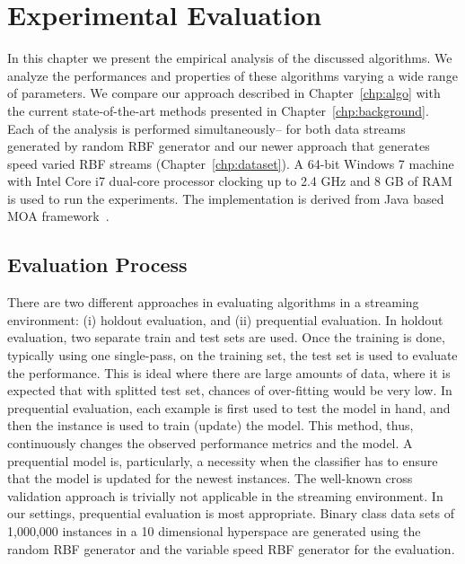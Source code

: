 \chapter{Experimental Evaluation}
\label{chp:exp}
In this chapter we present the empirical analysis of the discussed algorithms. We analyze the performances and properties of these algorithms varying a wide range of parameters. We compare our approach described in Chapter~\ref{chp:algo} with the current state-of-the-art methods presented in Chapter~\ref{chp:background}. Each of the analysis is performed simultaneously-- for both data streams generated by random RBF generator and our newer approach that generates speed varied RBF streams (Chapter~\ref{chp:dataset}). A 64-bit Windows 7 machine with Intel Core i7 dual-core processor clocking up to 2.4 GHz and 8 GB of RAM is used to run the experiments. The implementation is derived from Java based MOA framework~\cite{bifet:moa10}. 


\section{Evaluation Process}
There are two different approaches in evaluating algorithms in a streaming environment: (i) holdout evaluation, and (ii) prequential evaluation. In holdout evaluation, two separate train and test sets are used. Once the training is done, typically using one single-pass, on the training set, the test set is used to evaluate the performance. This is ideal where there are large amounts of data, where it is expected that with splitted test set, chances of over-fitting would be very low. In prequential evaluation, each example is first used to test the model in hand, and then the instance is used to train (update) the model. This method, thus, continuously changes the observed performance metrics and the model. A prequential model is, particularly, a necessity when the classifier has to ensure that the model is updated for the newest instances. The well-known cross validation approach is trivially not applicable in the streaming environment. In our settings, prequential evaluation is most appropriate. Binary class data sets of 1,000,000 instances in a 10 dimensional hyperspace are generated using the random RBF generator and the variable speed RBF generator for the evaluation. 

